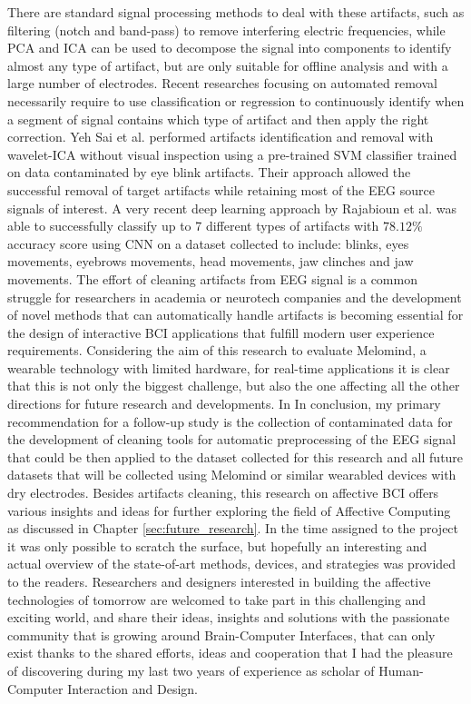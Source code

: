 There are standard signal processing methods to deal with these artifacts, such as filtering (notch and band-pass) to remove interfering electric frequencies, while \ac{PCA} and \ac{ICA} can be used to decompose the signal into components to identify almost any type of artifact, but are only suitable for offline analysis and with a large number of electrodes. Recent researches focusing on automated removal necessarily require to use classification or regression to continuously identify when a segment of signal contains which type of artifact and then apply the right correction. Yeh Sai et al. \cite{sai_automated_2018} performed artifacts identification and removal with wavelet-ICA without visual inspection using a pre-trained \ac{SVM} classifier trained on data contaminated by eye blink artifacts. Their approach allowed the successful removal of target artifacts while retaining most of the \ac{EEG} source signals of interest. A very recent deep learning approach by Rajabioun et al. \cite{rajabioun_deep_2021} was able to successfully classify up to 7 different types of artifacts with \(78.12\%\) accuracy score using \ac{CNN} on a dataset collected to include: blinks, eyes movements, eyebrows movements, head movements, jaw clinches and jaw movements. The effort of cleaning artifacts from \ac{EEG} signal is a common struggle for researchers in academia or neurotech companies and the development of novel methods that can automatically handle artifacts is becoming essential for the design of interactive \ac{BCI} applications that fulfill modern user experience requirements. Considering the aim of this research to evaluate Melomind, a wearable technology with limited hardware, for real-time applications it is clear that this is not only the biggest challenge, but also the one affecting all the other directions for future research and developments. In In conclusion, my primary recommendation for a follow-up study is the collection of contaminated data for the development of cleaning tools for automatic preprocessing of the \ac{EEG} signal that could be then applied to the dataset collected for this research and all future datasets that will be collected using Melomind or similar wearabled devices with dry electrodes. Besides artifacts cleaning, this research on affective \ac{BCI} offers various insights and ideas for further exploring the field of Affective Computing as discussed in Chapter \ref{sec:future_research}. In the time assigned to the project it was only possible to scratch the surface, but hopefully an interesting and actual overview of the state-of-art methods, devices, and strategies was provided to the readers. Researchers and designers interested in building the affective technologies of tomorrow are welcomed to take part in this challenging and exciting world, and share their ideas, insights and solutions with the passionate community that is growing around Brain-Computer Interfaces, that can only exist thanks to the shared efforts, ideas and cooperation that I had the pleasure of discovering during my last two years of experience as scholar of Human-Computer Interaction and Design.
